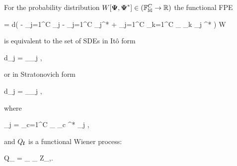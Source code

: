 \begin{theorem}
\label{thm:app-fpe:fpe-sde-func}
    For the probability distribution $W[\boldsymbol{\Psi}, \boldsymbol{\Psi}^*] \in (\mathbb{F}_{\mathbb{M}}^C \rightarrow \mathbb{R})$ the functional FPE
    \begin{eqn*}
\fl    	{}
    	= \int d\xvec \left(
    		- \sum_{j=1}^C  _j
    		- \sum_{j=1}^C  _j^*
    		+ \sum_{j=1}^C \sum_{k=1}^C 
    			\sum_{\lvec} _{k \lvec} _{j \lvec}^*
    	\right) W
    \end{eqn*}
    is equivalent to the set of SDEs in It\^{o} form
    \begin{eqn*}
    	d\Psi_j = _{\restbasis_j} ,
    \end{eqn*}
    or in Stratonovich form
    \begin{eqn*}
    	d\Psi_j = _{\restbasis_j} ,
    \end{eqn*}
    where
    \begin{eqn*}
    	_j = \sum_{c=1}^C \sum_{\lvec}
    		_{c \lvec}^*
    		_{j \lvec},
    \end{eqn*}
    and $Q_{\boldsymbol{l}}$ is a functional Wiener process:
    \begin{eqn*}
    	Q_{\lvec} = \sum_{\nvec \in \fullbasis} \phi_{\nvec} Z_{\lvec,\nvec}.
    \end{eqn*}
\end{theorem}

